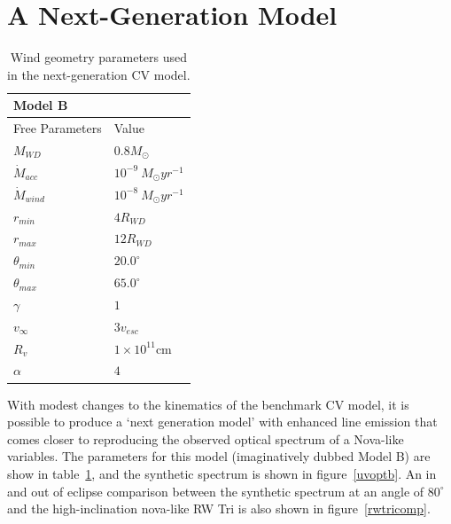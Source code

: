 \documentclass[preprint, a4paper, 11pt]{aastex}
\begin{document}


\newpage

%
%

\section{A Next-Generation Model}

\begin{table}
\centering
\begin{tabular}{p{3cm}p{4cm}}
Model B \\
\hline Free Parameters 	&	 Value \\ 
\hline \hline 
$M_{WD}$ 	 &	 $0.8 M_{\odot}$ \\ 
$\dot{M}_{acc}$ 	 &	 $10^{-9}~M_{\odot}yr^{-1}$\\ 
$\dot{M}_{wind}$  &	$10^{-8}~M_{\odot}yr^{-1}$\\ 
$r_{min}$ 	&	 $4 R_{WD}$\\ 
$r_{max}$ 	&	 $12 R_{WD}$ \\ 
$\theta_{min}$ 	&	 $20.0^{\circ}$ \\ 
$\theta_{max}$ 	&	 $65.0^{\circ}$ \\ 
$\gamma$ 	&	 $1$ \\ 
$v_{\infty}$ 	&	 $3v_{esc}$ \\ 
$R_v$ 	        &	 $1\times10^{11}$cm \\ 
$\alpha$ 	&	 $4$ \\
\end{tabular}
\centering
\caption{Wind geometry parameters used in the next-generation CV model.}
\label{modelb}
\end{table}

With modest changes to the kinematics of the benchmark CV model,
it is possible to produce a `next generation model' with enhanced
line emission that comes closer to reproducing the observed optical spectrum
of a Nova-like variables. The parameters for this model (imaginatively dubbed Model B)
are show in table~\ref{modelb}, and the synthetic spectrum
is shown in figure~\ref{uvoptb}. An in and out of eclipse comparison 
between the synthetic spectrum
at an angle of $80^\circ$ and the high-inclination nova-like RW Tri 
is also shown in figure~\ref{rwtricomp}.
\end{document}
